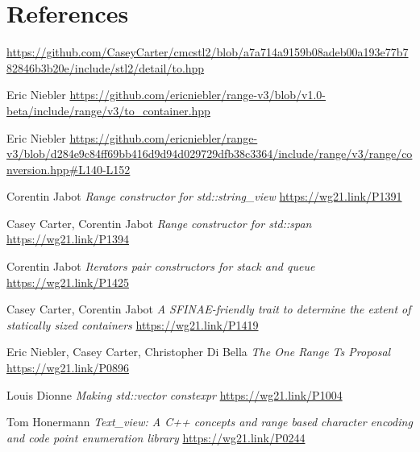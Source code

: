 \documentclass{wg21}
\begin{document}
\section{References}
\renewcommand{\section}[2]{}%
\begin{thebibliography}{9}

	\url{https://github.com/CaseyCarter/cmcstl2/blob/a7a714a9159b08adeb00a193e77b782846b3b20e/include/stl2/detail/to.hpp}

    Eric Niebler
	\url{https://github.com/ericniebler/range-v3/blob/v1.0-beta/include/range/v3/to_container.hpp}

Eric Niebler
\url{https://github.com/ericniebler/range-v3/blob/d284e9c84ff69bb416d9d94d029729dfb38c3364/include/range/v3/range/conversion.hpp#L140-L152}

	Corentin Jabot
	\emph{Range constructor for std::string\_view}\newline
	\url{https://wg21.link/P1391}

	Casey Carter, Corentin Jabot
	\emph{Range constructor for std::span}\newline
	\url{https://wg21.link/P1394}

	Corentin Jabot
	\emph{Iterators pair constructors for stack and queue}\newline
	\url{https://wg21.link/P1425}

	Casey Carter, Corentin Jabot
	\emph{A SFINAE-friendly trait to determine the extent of statically sized containers}\newline
	\url{https://wg21.link/P1419}

    Eric Niebler, Casey Carter, Christopher Di Bella
    \emph{The One Range Ts Proposal}\newline
    \url{https://wg21.link/P0896}

    Louis Dionne
    \emph{Making std::vector constexpr}\newline
    \url{https://wg21.link/P1004}

    Tom Honermann
    \emph{Text_view: A C++ concepts and range based character encoding and code point enumeration library}\newline
    \url{https://wg21.link/P0244}


\end{thebibliography}
\end{document}
